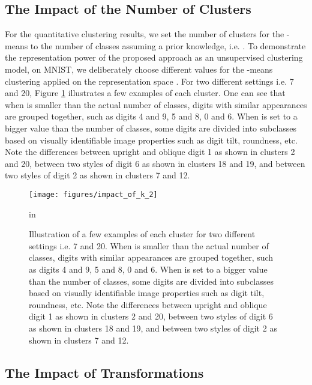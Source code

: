 \documentclass{article} \usepackage{iclr2018_conference,times}
\begin{document}
\subsection{The Impact of the Number of Clusters }

For the quantitative clustering results, we set the number of clusters for the -means to the number of classes assuming a prior knowledge, i.e. . To demonstrate the representation power of the proposed approach as an unsupervised clustering model, on MNIST, we deliberately choose different  values for the -means clustering applied on the representation space . For two different  settings i.e. 7 and 20, Figure \ref{fig:pseudo_impact_k} illustrates a few examples of each cluster. One can see that when  is smaller than the actual number of classes, digits with similar appearances are grouped together, such as digits 4 and 9, 5 and 8, 0 and 6. When  is set to a bigger value than the number of classes, some digits are divided into subclasses based on visually identifiable image properties such as digit tilt, roundness, etc. Note the differences between upright and oblique digit 1 as shown in clusters 2 and 20, between two styles of digit 6 as shown in clusters 18 and 19, and between two styles of digit 2 as shown in clusters 7 and 12.
\begin{figure}[h]
	\begin{center}
		\centerline{\texttt{[image: figures/impact\_of\_k\_2]}}
		\caption{Illustration of a few examples of each cluster for two different  settings i.e. 7 and 20. When  is smaller than the actual number of classes, digits with similar appearances are grouped together, such as digits 4 and 9, 5 and 8, 0 and 6. When  is set to a bigger value than the number of classes, some digits are divided into subclasses based on visually identifiable image properties such as digit tilt, roundness, etc. Note the differences between upright and oblique digit 1 as shown in clusters 2 and 20, between two styles of digit 6 as shown in clusters 18 and 19, and between two styles of digit 2 as shown in clusters 7 and 12.}
		\label{fig:pseudo_impact_k}
	\end{center}
	 in
\end{figure}

\subsection{The Impact of Transformations}
\end{document}
